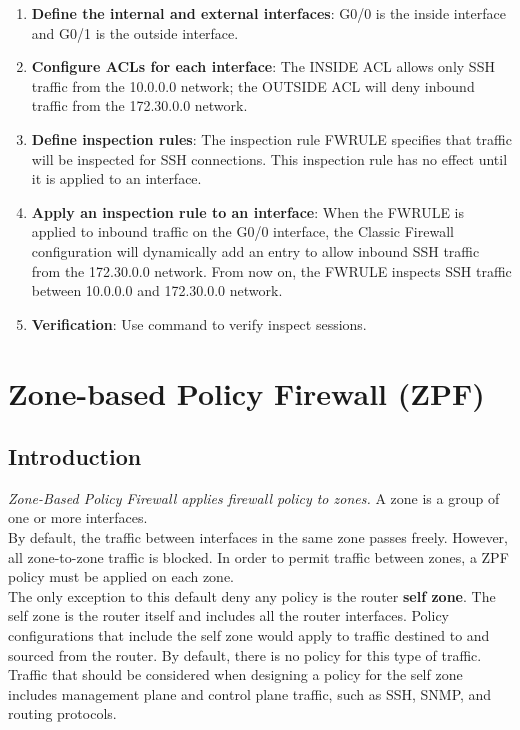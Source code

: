 \begin{enumerate}
\item \textbf{Define the internal and external interfaces}: G0/0 is the inside interface and G0/1 is the outside interface.
\item \textbf{Configure ACLs for each interface}: The INSIDE ACL allows only SSH traffic from the 10.0.0.0 network; the OUTSIDE ACL will deny inbound traffic from the 172.30.0.0 network.
\item \textbf{Define inspection rules}: The inspection rule FWRULE specifies that traffic will be inspected for SSH connections. This inspection rule has no effect until it is applied to an interface.
\item \textbf{Apply an inspection rule to an interface}: When the FWRULE is applied to inbound traffic on the G0/0 interface, the Classic Firewall configuration will dynamically add an entry to allow inbound SSH traffic from the 172.30.0.0 network. From now on, the FWRULE inspects SSH traffic between 10.0.0.0 and 172.30.0.0 network.
\item \textbf{Verification}: Use  command to verify inspect sessions.
\end{enumerate}

\section{Zone-based Policy Firewall (ZPF)}\label{sec:ZPF}

\subsection{Introduction}

\emph{Zone-Based Policy Firewall applies firewall policy to zones.} A zone is a group of one or more interfaces. \\

By default, the traffic between interfaces in the same zone passes freely. However, all zone-to-zone traffic is blocked. In order to permit traffic between zones, a ZPF policy must be applied on each zone.\\

The only exception to this default deny any policy is the router \textbf{self zone}. The self zone is the router itself and includes all the router interfaces. Policy configurations that include the self zone would apply to traffic destined to and sourced from the router. By default, there is no policy for this type of traffic. Traffic that should be considered when designing a policy for the self zone includes management plane and control plane traffic, such as SSH, SNMP, and routing protocols.\\

